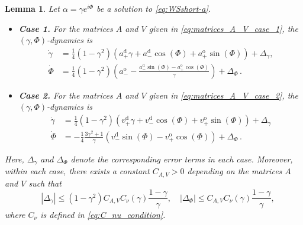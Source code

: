 \documentclass[10pt]{article}
\newtheorem{lemma}[theorem]{Lemma}
\theoremstyle{definition}
\theoremstyle{definition}
\numberwithin{equation}{section}
\newcommand{\aDPlus}{a_+^{\text{d}}}
\newcommand{\aDMinus}{a_-^{\text{d}}}
\newcommand{\aOPlus}{a_+^{\text{o}}}
\newcommand{\aOMinus}{a_-^{\text{o}}}
\newcommand{\vDPlus}{v_+^{\text{d}}}
\newcommand{\vDMinus}{v_-^{\text{d}}}
\newcommand{\vOPlus}{v_+^{\text{o}}}
\newcommand{\DeltaGamma}{\Delta_{\gamma}}
\newcommand{\DeltaPhi}{\Delta_{\Phi}}
\begin{document}
\begin{lemma}\label{lem:stability_case1_case2}
Let $\alpha=\gamma e^{i\Phi}$ be a solution to \eqref{eq:WSshort-a}. 
\begin{itemize}
    \item \textbf{Case 1.}
    For the matrices $A$ and $V$ given in \eqref{eq:matrices_A_V_case_1}, the $(\gamma, \Phi)$-dynamics is
    \begin{equation}\label{eq:error_case1}
    \begin{aligned}
    \dot{\gamma} &= \frac{1}{4} \left(1 - \gamma^2 \right) \left( \aDPlus \gamma + \aDMinus \cos (\Phi) + \aOPlus \sin (\Phi) \right) + \Delta_\gamma,\\[4pt]
    \dot{\Phi} &= \frac{1}{4} \left(1 - \gamma^2 \right) \left( \aOMinus - \frac{\aDMinus \sin (\Phi) - \aOPlus \cos (\Phi)}{\gamma} \right) + \Delta_{\Phi} \, .
    \end{aligned}
    \end{equation}

    \item \textbf{Case 2.}
    For the matrices $A$ and $V$ given in \eqref{eq:matrices_A_V_case_2}, the $(\gamma, \Phi)$-dynamics is
    \begin{equation}\label{eq:error_case2}
    \begin{aligned}
    \dot{\gamma} &= \frac{1}{4} \left( 1 - \gamma^2 \right) \left( \vDPlus \gamma + \vDMinus \cos (\Phi) + \vOPlus \sin (\Phi) \right) + \DeltaGamma\\[4pt]
    \dot{\Phi} &= -\frac{1}{4} \frac{3\gamma^2 + 1}{\gamma} \left( \vDMinus \sin (\Phi) - \vOPlus \cos (\Phi) \right) + \DeltaPhi\, .
    \end{aligned}
    \end{equation}
\end{itemize}
Here, \(\Delta_\gamma\) and \(\Delta_\Phi\) denote the corresponding error terms in each case.
Moreover, within each case, there exists a constant $C_{A,V} > 0$ depending on the matrices $A$ and $V$ such that
\begin{equation*}
\quad |\Delta_\gamma|\leq (1-\gamma^2) C_{A,V} C_\nu(\gamma)\frac{1-\gamma}{\gamma},\quad |\Delta_\Phi|\leq C_{A,V} C_\nu(\gamma)\frac{1-\gamma}{\gamma},
\end{equation*}
where $C_{\nu}$ is defined in \eqref{eq:C_nu_condition}.
\end{lemma}
\end{document}

